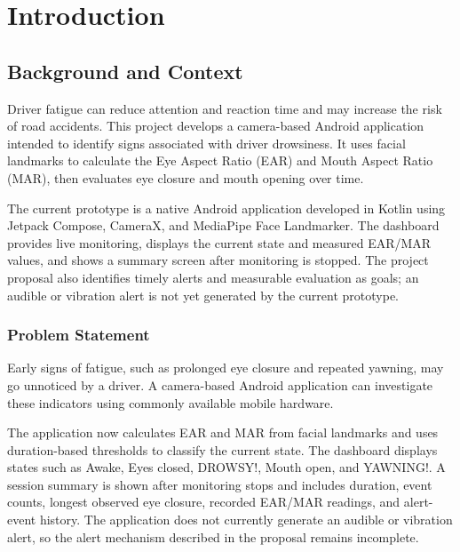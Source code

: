 \documentclass{tietreport}
\author{%
  \texttt{1024030725} Arshita Gupta \\
  \texttt{1024030730} Tarushi Goyal \\
  \texttt{1024030746} Chahana Goyal%
}
\author{%
  \texttt{1024030725} Arshita Gupta \\
  \texttt{1024030730} Tarushi Goyal \\
  \texttt{1024030746} Chahana Goyal%
}
\begin{document}
\maketitle
\tableofcontents

\chapter{Introduction}

\section{Background and Context}
Driver fatigue can reduce attention and reaction time and may increase the risk of road accidents. This project develops a camera-based Android application intended to identify signs associated with driver drowsiness. It uses facial landmarks to calculate the Eye Aspect Ratio (EAR) and Mouth Aspect Ratio (MAR), then evaluates eye closure and mouth opening over time.

The current prototype is a native Android application developed in Kotlin using Jetpack Compose, CameraX, and MediaPipe Face Landmarker. The dashboard provides live monitoring, displays the current state and measured EAR/MAR values, and shows a summary screen after monitoring is stopped. The project proposal also identifies timely alerts and measurable evaluation as goals; an audible or vibration alert is not yet generated by the current prototype.

\subsection{Problem Statement}
Early signs of fatigue, such as prolonged eye closure and repeated yawning, may go unnoticed by a driver. A camera-based Android application can investigate these indicators using commonly available mobile hardware.

The application now calculates EAR and MAR from facial landmarks and uses duration-based thresholds to classify the current state. The dashboard displays states such as Awake, Eyes closed, DROWSY!, Mouth open, and YAWNING!. A session summary is shown after monitoring stops and includes duration, event counts, longest observed eye closure, recorded EAR/MAR readings, and alert-event history. The application does not currently generate an audible or vibration alert, so the alert mechanism described in the proposal remains incomplete.
\end{document}
